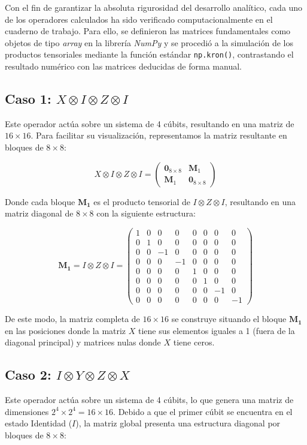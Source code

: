 \documentclass[11pt,a4paper,spanish]{book}
\begin{document}
    Con el fin de garantizar la absoluta rigurosidad del desarrollo analítico, cada uno de los operadores calculados ha sido verificado computacionalmente en el cuaderno de trabajo. Para ello, se definieron las matrices fundamentales como objetos de tipo \textit{array} en la librería \textit{NumPy} y se procedió a la simulación de los productos tensoriales mediante la función estándar \texttt{np.kron()}, contrastando el resultado numérico con las matrices deducidas de forma manual. \cite{numpy2020}

\subsection{Caso 1: $X \otimes I \otimes Z \otimes I$}
Este operador actúa sobre un sistema de 4 cúbits, resultando en una matriz de $16 \times 16$. Para facilitar su visualización, representamos la matriz resultante en bloques de $8 \times 8$:

\[
X \otimes I \otimes Z \otimes I = 
\begin{pmatrix}
\mathbf{0}_{8 \times 8} & \mathbf{M}_1 \\
\mathbf{M}_1 & \mathbf{0}_{8 \times 8}
\end{pmatrix}
\]

Donde cada bloque $\mathbf{M_1}$ es el producto tensorial de $I \otimes Z \otimes I$, resultando en una matriz diagonal de $8 \times 8$ con la siguiente estructura:

\[
\mathbf{M_1} = I \otimes Z \otimes I = 
\begin{pmatrix}
1 & 0 & 0 & 0 & 0 & 0 & 0 & 0 \\
0 & 1 & 0 & 0 & 0 & 0 & 0 & 0 \\
0 & 0 & -1 & 0 & 0 & 0 & 0 & 0 \\
0 & 0 & 0 & -1 & 0 & 0 & 0 & 0 \\
0 & 0 & 0 & 0 & 1 & 0 & 0 & 0 \\
0 & 0 & 0 & 0 & 0 & 1 & 0 & 0 \\
0 & 0 & 0 & 0 & 0 & 0 & -1 & 0 \\
0 & 0 & 0 & 0 & 0 & 0 & 0 & -1 
\end{pmatrix}
\]

De este modo, la matriz completa de $16 \times 16$ se construye situando el bloque $\mathbf{M_1}$ en las posiciones donde la matriz $X$ tiene sus elementos iguales a 1 (fuera de la diagonal principal) y matrices nulas donde $X$ tiene ceros.

\subsection{Caso 2: $I \otimes Y \otimes Z \otimes X$}
Este operador actúa sobre un sistema de 4 cúbits, lo que genera una matriz de dimensiones $2^4 \times 2^4 = 16 \times 16$. Debido a que el primer cúbit se encuentra en el estado Identidad ($I$), la matriz global presenta una estructura diagonal por bloques de $8 \times 8$:
\end{document}
